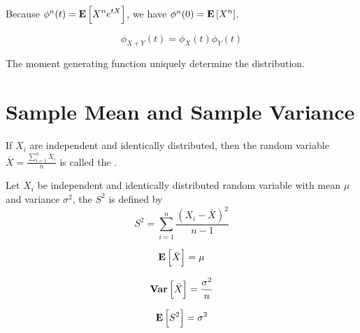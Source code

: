 Because $\phi^n (t) = \mathop{\bf E\/}\displaystyle \left[ X^n e^{tX} \right]$, we have $\phi^n(0) = \mathop{\bf E\/}\displaystyle \left[ X^n \right]$.

\begin{theorem}
    \begin{equation}
        \phi_{X+Y}(t) = \phi_X(t) \phi_Y(t)
    \end{equation}    
\end{theorem}

\begin{theorem}
The moment generating function uniquely determine the distribution.    
\end{theorem}




\section{Sample Mean and Sample Variance}


\begin{definition}
    If $X_i$ are independent and identically distributed, then the random variable $\bar{X} =\displaystyle \frac{\sum_{i=1}^n X_i}{n}$ is called the .
\end{definition}

\begin{definition}
    Let $X_i$ be independent and identically distributed random variable with mean $\mu$ and variance $\sigma^2$, the  $S^2$ is defined by 
\begin{equation}
    S^2 = \sum_{i=1}^n \displaystyle \frac{(X_i - \bar{X})^2}{n - 1}
\end{equation} 
\end{definition}



\begin{theorem}
\begin{equation}
    \mathop{\bf E\/}\displaystyle \left[ \bar{X} \right] = \mu
\end{equation}    
\end{theorem}

\begin{theorem}
\begin{equation}
    \mathop{\bf Var\/}\displaystyle \left[ \bar{X} \right] = \frac{\sigma^2}{n}
\end{equation}    
\end{theorem}


\begin{theorem}
\begin{equation}
    \mathop{\bf E\/}\displaystyle \left[ S^2 \right] = \sigma^2
\end{equation}    
\end{theorem}


